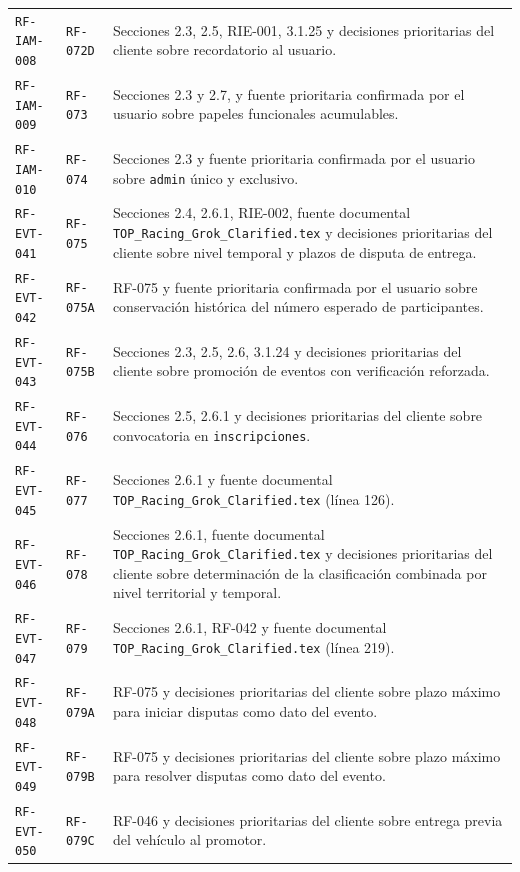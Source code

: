 \documentclass[10pt,letterpaper]{article}
\begin{document}
\begin{landscape}
\begin{longtable}{P{2.7cm}P{2.6cm}P{15.7cm}}
\texttt{RF-IAM-008} & \texttt{RF-072D} & Secciones 2.3, 2.5, RIE-001, 3.1.25 y decisiones prioritarias del cliente sobre recordatorio al usuario.\\
\texttt{RF-IAM-009} & \texttt{RF-073} & Secciones 2.3 y 2.7, y fuente prioritaria confirmada por el usuario sobre papeles funcionales acumulables.\\
\texttt{RF-IAM-010} & \texttt{RF-074} & Secciones 2.3 y fuente prioritaria confirmada por el usuario sobre \texttt{admin} único y exclusivo.\\
\texttt{RF-EVT-041} & \texttt{RF-075} & Secciones 2.4, 2.6.1, RIE-002, fuente documental \texttt{TOP\_Racing\_Grok\_Clarified.tex} y decisiones prioritarias del cliente sobre nivel temporal y plazos de disputa de entrega.\\
\texttt{RF-EVT-042} & \texttt{RF-075A} & RF-075 y fuente prioritaria confirmada por el usuario sobre conservación histórica del número esperado de participantes.\\
\texttt{RF-EVT-043} & \texttt{RF-075B} & Secciones 2.3, 2.5, 2.6, 3.1.24 y decisiones prioritarias del cliente sobre promoción de eventos con verificación reforzada.\\
\texttt{RF-EVT-044} & \texttt{RF-076} & Secciones 2.5, 2.6.1 y decisiones prioritarias del cliente sobre convocatoria en \texttt{inscripciones}.\\
\texttt{RF-EVT-045} & \texttt{RF-077} & Secciones 2.6.1 y fuente documental \texttt{TOP\_Racing\_Grok\_Clarified.tex} (línea 126).\\
\texttt{RF-EVT-046} & \texttt{RF-078} & Secciones 2.6.1, fuente documental \texttt{TOP\_Racing\_Grok\_Clarified.tex} y decisiones prioritarias del cliente sobre determinación de la clasificación combinada por nivel territorial y temporal.\\
\texttt{RF-EVT-047} & \texttt{RF-079} & Secciones 2.6.1, RF-042 y fuente documental \texttt{TOP\_Racing\_Grok\_Clarified.tex} (línea 219).\\
\texttt{RF-EVT-048} & \texttt{RF-079A} & RF-075 y decisiones prioritarias del cliente sobre plazo máximo para iniciar disputas como dato del evento.\\
\texttt{RF-EVT-049} & \texttt{RF-079B} & RF-075 y decisiones prioritarias del cliente sobre plazo máximo para resolver disputas como dato del evento.\\
\texttt{RF-EVT-050} & \texttt{RF-079C} & RF-046 y decisiones prioritarias del cliente sobre entrega previa del vehículo al promotor.\\

\end{longtable}
\end{landscape}
\end{document}
